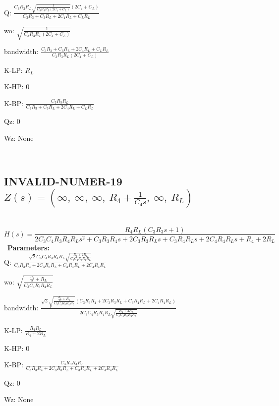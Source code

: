 \documentclass{article}
\begin{document}
Q: $\frac{C_{3} R_{3} R_{L} \sqrt{\frac{1}{C_{3} R_{3} R_{L} \left(2 C_{4} + C_{L}\right)}} \left(2 C_{4} + C_{L}\right)}{C_{3} R_{3} + C_{3} R_{L} + 2 C_{4} R_{L} + C_{L} R_{L}}$\ 

wo: $\sqrt{\frac{1}{C_{3} R_{3} R_{L} \left(2 C_{4} + C_{L}\right)}}$\ 

bandwidth: $\frac{C_{3} R_{3} + C_{3} R_{L} + 2 C_{4} R_{L} + C_{L} R_{L}}{C_{3} R_{3} R_{L} \left(2 C_{4} + C_{L}\right)}$\ 

K-LP: $R_{L}$\ 

K-HP: $0$\ 

K-BP: $\frac{C_{3} R_{3} R_{L}}{C_{3} R_{3} + C_{3} R_{L} + 2 C_{4} R_{L} + C_{L} R_{L}}$\ 

Qz: $0$\ 

Wz: $\text{None}$\ 

\ 

\subsection{INVALID-NUMER-19 $Z(s) = \left( \infty, \  \infty, \  \infty, \  R_{4} + \frac{1}{C_{4} s}, \  \infty, \  R_{L}\right)$ } \ 
\textbf{\[H(s) = \frac{R_{4} R_{L} \left(C_{3} R_{3} s + 1\right)}{2 C_{3} C_{4} R_{3} R_{4} R_{L} s^{2} + C_{3} R_{3} R_{4} s + 2 C_{3} R_{3} R_{L} s + C_{3} R_{4} R_{L} s + 2 C_{4} R_{4} R_{L} s + R_{4} + 2 R_{L}}\] } \ 
\textbf{Parameters:}\\ 

Q: $\frac{\sqrt{2} C_{3} C_{4} R_{3} R_{4} R_{L} \sqrt{\frac{R_{4} + 2 R_{L}}{C_{3} C_{4} R_{3} R_{4} R_{L}}}}{C_{3} R_{3} R_{4} + 2 C_{3} R_{3} R_{L} + C_{3} R_{4} R_{L} + 2 C_{4} R_{4} R_{L}}$\ 

wo: $\sqrt{\frac{\frac{R_{4}}{2} + R_{L}}{C_{3} C_{4} R_{3} R_{4} R_{L}}}$\ 

bandwidth: $\frac{\sqrt{2} \sqrt{\frac{\frac{R_{4}}{2} + R_{L}}{C_{3} C_{4} R_{3} R_{4} R_{L}}} \left(C_{3} R_{3} R_{4} + 2 C_{3} R_{3} R_{L} + C_{3} R_{4} R_{L} + 2 C_{4} R_{4} R_{L}\right)}{2 C_{3} C_{4} R_{3} R_{4} R_{L} \sqrt{\frac{R_{4} + 2 R_{L}}{C_{3} C_{4} R_{3} R_{4} R_{L}}}}$\ 

K-LP: $\frac{R_{4} R_{L}}{R_{4} + 2 R_{L}}$\ 

K-HP: $0$\ 

K-BP: $\frac{C_{3} R_{3} R_{4} R_{L}}{C_{3} R_{3} R_{4} + 2 C_{3} R_{3} R_{L} + C_{3} R_{4} R_{L} + 2 C_{4} R_{4} R_{L}}$\ 

Qz: $0$\ 

Wz: $\text{None}$\ 
\end{document}
